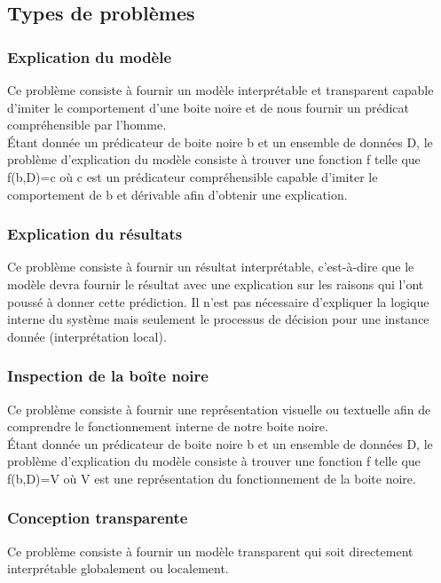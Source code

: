 \subsection{Types de problèmes}
\subsubsection{Explication du modèle}
Ce problème consiste à fournir un modèle interprétable et transparent capable d'imiter le comportement d'une boite noire et de nous fournir un prédicat compréhensible par l'homme.\\
Étant donnée un prédicateur de boite noire b et un ensemble de données D, le problème d'explication du modèle consiste à trouver une fonction f telle que f(b,D)=c où c est un prédicateur compréhensible capable d'imiter le comportement de b et dérivable afin d'obtenir une explication.

\subsubsection{Explication du résultats}
Ce problème consiste à fournir un résultat interprétable, c'est-à-dire que le modèle devra fournir le résultat avec une explication sur les raisons qui l'ont poussé à donner cette prédiction. Il n'est pas nécessaire d'expliquer la logique interne du système mais seulement le processus de décision pour une instance donnée (interprétation local).

\subsubsection{Inspection de la boîte noire}
Ce problème consiste à fournir une représentation visuelle ou textuelle afin de comprendre le fonctionnement interne de notre boite noire.\\
Étant donnée un prédicateur de boite noire b et un ensemble de données D, le problème d'explication du modèle consiste à trouver une fonction f telle que f(b,D)=V où V est une représentation du fonctionnement de la boite noire.

\subsubsection{Conception transparente}
Ce problème consiste à fournir un modèle transparent qui soit directement interprétable globalement ou localement.

